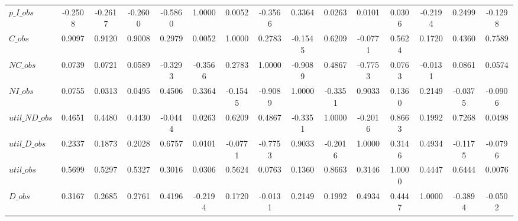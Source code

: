 \begin{center}
\begin{longtable}{lcccccccccccccc}
$p\_I\_obs      $	 & 	          -0.2508	 & 	          -0.2617	 & 	          -0.2600	 & 	          -0.5860	 & 	           1.0000	 & 	           0.0052	 & 	          -0.3566	 & 	           0.3364	 & 	           0.0263	 & 	           0.0101	 & 	           0.0306	 & 	          -0.2194	 & 	           0.2499	 & 	          -0.1298 \\ 
$C\_obs         $	 & 	           0.9097	 & 	           0.9120	 & 	           0.9008	 & 	           0.2979	 & 	           0.0052	 & 	           1.0000	 & 	           0.2783	 & 	          -0.1545	 & 	           0.6209	 & 	          -0.0771	 & 	           0.5624	 & 	           0.1720	 & 	           0.4360	 & 	           0.7589 \\ 
$NC\_obs        $	 & 	           0.0739	 & 	           0.0721	 & 	           0.0589	 & 	          -0.3293	 & 	          -0.3566	 & 	           0.2783	 & 	           1.0000	 & 	          -0.9089	 & 	           0.4867	 & 	          -0.7753	 & 	           0.0763	 & 	          -0.0131	 & 	           0.0861	 & 	           0.0574 \\ 
$NI\_obs        $	 & 	           0.0755	 & 	           0.0313	 & 	           0.0495	 & 	           0.4506	 & 	           0.3364	 & 	          -0.1545	 & 	          -0.9089	 & 	           1.0000	 & 	          -0.3351	 & 	           0.9033	 & 	           0.1360	 & 	           0.2149	 & 	          -0.0375	 & 	          -0.0906 \\ 
$util\_ND\_obs  $	 & 	           0.4651	 & 	           0.4480	 & 	           0.4430	 & 	          -0.0444	 & 	           0.0263	 & 	           0.6209	 & 	           0.4867	 & 	          -0.3351	 & 	           1.0000	 & 	          -0.2016	 & 	           0.8663	 & 	           0.1992	 & 	           0.7268	 & 	           0.0498 \\ 
$util\_D\_obs   $	 & 	           0.2337	 & 	           0.1873	 & 	           0.2028	 & 	           0.6757	 & 	           0.0101	 & 	          -0.0771	 & 	          -0.7753	 & 	           0.9033	 & 	          -0.2016	 & 	           1.0000	 & 	           0.3146	 & 	           0.4934	 & 	          -0.1175	 & 	          -0.0796 \\ 
$util\_obs      $	 & 	           0.5699	 & 	           0.5297	 & 	           0.5327	 & 	           0.3016	 & 	           0.0306	 & 	           0.5624	 & 	           0.0763	 & 	           0.1360	 & 	           0.8663	 & 	           0.3146	 & 	           1.0000	 & 	           0.4447	 & 	           0.6444	 & 	           0.0076 \\ 
$D\_obs         $	 & 	           0.3167	 & 	           0.2685	 & 	           0.2761	 & 	           0.4196	 & 	          -0.2194	 & 	           0.1720	 & 	          -0.0131	 & 	           0.2149	 & 	           0.1992	 & 	           0.4934	 & 	           0.4447	 & 	           1.0000	 & 	          -0.3894	 & 	          -0.0502 \\ 

\end{longtable}
\end{center}

